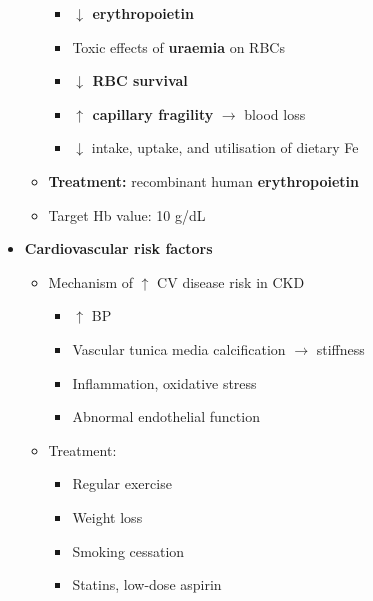\documentclass[
  12pt,
]{memoir}
\providecommand{\tightlist}{%
  \setlength{\itemsep}{0pt}\setlength{\parskip}{0pt}}
\begin{document}
\begin{itemize}
\begin{itemize}
    \begin{itemize}
    \tightlist
    \item
      \textbf{\(\boldsymbol\downarrow\) erythropoietin}
    \item
      Toxic effects of \textbf{uraemia} on RBCs
    \item
      \textbf{\(\boldsymbol\downarrow\) RBC survival}
    \item
      \textbf{\(\boldsymbol\uparrow\) capillary fragility}
      \(\rightarrow\) blood loss
    \item
      \(\downarrow\) intake, uptake, and utilisation of dietary Fe
    \end{itemize}
  \item
    \textbf{Treatment:} recombinant human \textbf{erythropoietin}
  \item
    Target Hb value: 10 g/dL
  \end{itemize}
\item
  \textbf{Cardiovascular risk factors}

  \begin{itemize}
  \tightlist
  \item
    Mechanism of \(\uparrow\) CV disease risk in CKD

    \begin{itemize}
    \tightlist
    \item
      \(\uparrow\) BP
    \item
      Vascular tunica media calcification \(\rightarrow\) stiffness
    \item
      Inflammation, oxidative stress
    \item
      Abnormal endothelial function
    \end{itemize}
  \item
    Treatment:

    \begin{itemize}
    \tightlist
    \item
      Regular exercise
    \item
      Weight loss
    \item
      Smoking cessation
    \item
      Statins, low-dose aspirin
    \end{itemize}
  \end{itemize}
\end{itemize}
\end{document}
